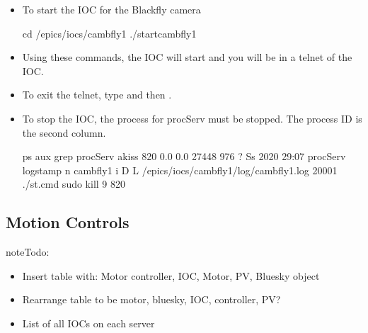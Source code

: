 \documentclass[letterpaper,10pt,english]{sphinxmanual}
\begin{document}
\begin{description}
\begin{itemize}
\item {} 
To start the IOC for the Blackfly camera

\begin{sphinxVerbatim}[commandchars=\\\{\}]
\PYGZdl{} cd /epics/iocs/cam\PYGZhy{}bfly1
\PYGZdl{} ./start\PYGZus{}cam\PYGZus{}bfly1
\end{sphinxVerbatim}

\item {} 
Using these commands, the IOC will start and you will be in a telnet of the IOC.

\item {} 
To exit the telnet, type \sphinxcode{\sphinxupquote{Ctrl+{]}}} and then .

\item {} 
To stop the IOC, the process for procServ must be stopped. The process ID is the second column.

\begin{sphinxVerbatim}[commandchars=\\\{\}]
\PYGZdl{} ps aux \textbar{} grep procServ
akiss      820  0.0  0.0  27448   976 ?        Ss    2020  29:07 procServ \PYGZhy{}\PYGZhy{}logstamp \PYGZhy{}n cam\PYGZhy{}bfly1 \PYGZhy{}i \PYGZca{}D \PYGZhy{}L /epics/iocs/cam\PYGZhy{}bfly1/log/cam\PYGZhy{}bfly1.log 20001 ./st.cmd
\PYGZdl{} sudo kill \PYGZhy{}9 820
\end{sphinxVerbatim}

\end{itemize}

\end{description}


\subsection{Motion Controls}
\label{\detokenize{staff:motion-controls}}
\begin{sphinxadmonition}{note}{\label{staff:index-4}Todo:}\begin{itemize}
\item {} 
Insert table with: Motor controller, IOC, Motor, PV, Bluesky object

\item {} 
Rearrange table to be motor, bluesky, IOC, controller, PV?

\item {} 
List of all IOCs on each server

\end{itemize}
\end{sphinxadmonition}
\end{document}
